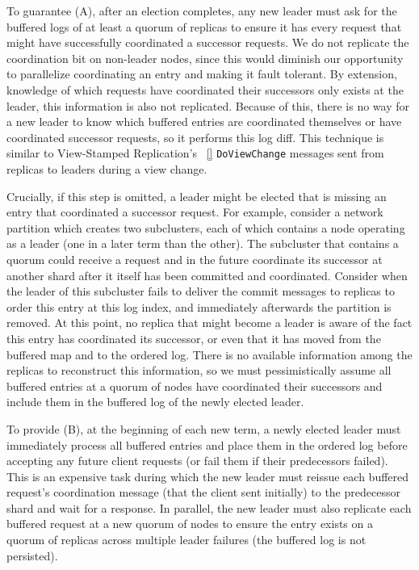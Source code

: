 To guarantee (A), after an election completes, any new leader must ask for the buffered logs of at least a quorum of replicas to ensure it has every request that might have successfully coordinated a successor requests. We do not replicate the coordination bit on non-leader nodes, since this would diminish our opportunity to parallelize coordinating an entry and making it fault tolerant. By extension, knowledge of which requests have coordinated their successors only exists at the leader, this information is also not replicated. Because of this, there is no way for a new leader to know which buffered entries are coordinated themselves or have coordinated successor requests, so it performs this log diff. This technique is similar to View-Stamped Replication's ~\ref{} \texttt{DoViewChange} messages sent from replicas to leaders during a view change. 

Crucially, if this step is omitted, a leader might be elected that is missing an entry that coordinated a successor request. For example, consider a network partition which creates two subclusters, each of which contains a node operating as a leader (one in a later term than the other). The subcluster that contains a quorum could receive a request and in the future coordinate its successor at another shard after it itself has been committed and coordinated. Consider when the leader of this subcluster fails to deliver the commit messages to replicas to order this entry at this log index, and immediately afterwards the partition is removed. At this point, no replica that might become a leader is aware of the fact this entry has coordinated its successor, or even that it has moved from the buffered map and to the ordered log. There is no available information among the replicas to reconstruct this information, so we must pessimistically assume all buffered entries at a quorum of nodes have coordinated their successors and include them in the buffered log of the newly elected leader.

To provide (B), at the beginning of each new term, a newly elected leader must immediately process all buffered entries and place them in the ordered log before accepting any future client requests (or fail them if their predecessors failed). This is an expensive task during which the new leader must reissue each buffered request's coordination message (that the client sent initially) to the predecessor shard and wait for a response. In parallel, the new leader must also replicate each buffered request at a new quorum of nodes to ensure the entry exists on a quorum of replicas across multiple leader failures (the buffered log is not persisted).

